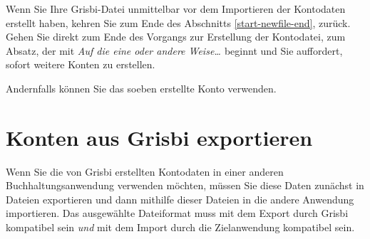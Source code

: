 Wenn Sie Ihre Grisbi-Datei unmittelbar vor dem Importieren der Kontodaten erstellt haben, kehren Sie zum Ende des Abschnitts \vref{start-newfile-end},  zurück. Gehen Sie direkt zum Ende des Vorgangs zur Erstellung der Kontodatei, zum Absatz, der mit \emph{Auf die eine oder andere Weise\ldots{ }} beginnt und Sie auffordert, sofort weitere Konten zu erstellen.

Andernfalls können Sie das soeben erstellte Konto verwenden.


\section{Konten aus Grisbi exportieren\label{importexport-export}}%

Wenn Sie die von Grisbi erstellten Kontodaten in einer anderen Buchhaltungsanwendung verwenden möchten, müssen Sie diese Daten zunächst in Dateien exportieren und dann mithilfe dieser Dateien in die andere Anwendung importieren. Das ausgewählte Dateiformat muss mit dem Export durch Grisbi kompatibel sein \emph{und} mit dem Import durch die Zielanwendung kompatibel sein.


